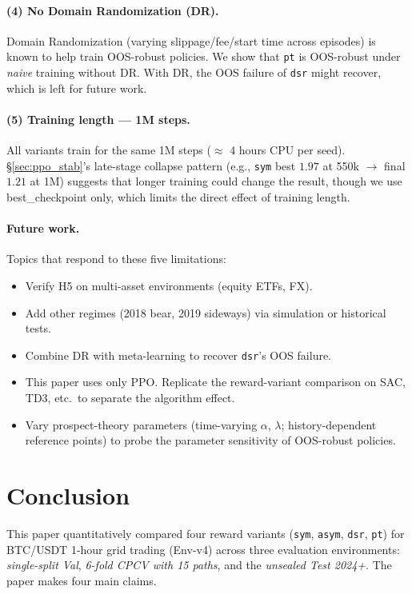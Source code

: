 \documentclass[11pt, a4paper]{article}
\begin{document}
\paragraph{(4) No Domain Randomization (DR).}
Domain Randomization (varying slippage/fee/start time across episodes) is
known to help train OOS-robust policies. We show that \texttt{pt} is
OOS-robust under \emph{naive} training without DR. With DR, the OOS failure
of \texttt{dsr} might recover, which is left for future work.

\paragraph{(5) Training length --- 1M steps.}
All variants train for the same 1M steps ($\approx$ 4 hours CPU per seed).
\S\ref{sec:ppo_stab}'s late-stage collapse pattern (e.g., \texttt{sym} best
$1.97$ at 550k $\to$ final $1.21$ at 1M) suggests that longer training could
change the result, though we use best\_checkpoint only, which limits the
direct effect of training length.

\paragraph{Future work.}
Topics that respond to these five limitations:
\begin{itemize}[leftmargin=*]
\item Verify H5 on multi-asset environments (equity ETFs, FX).
\item Add other regimes (2018 bear, 2019 sideways) via simulation or
historical tests.
\item Combine DR with meta-learning to recover \texttt{dsr}'s OOS failure.
\item This paper uses only PPO. Replicate the reward-variant comparison
on SAC, TD3, etc.\ to separate the algorithm effect.
\item Vary prospect-theory parameters (time-varying $\alpha$, $\lambda$;
history-dependent reference points) to probe the parameter sensitivity of
OOS-robust policies.
\end{itemize}

\section{Conclusion}
\label{sec:conclusion}

This paper quantitatively compared four reward variants
(\texttt{sym}, \texttt{asym}, \texttt{dsr}, \texttt{pt}) for BTC/USDT 1-hour
grid trading (Env-v4) across three evaluation environments: \emph{single-split
Val}, \emph{6-fold CPCV with 15 paths}, and the \emph{unsealed Test 2024+}.
The paper makes four main claims.
\end{document}
